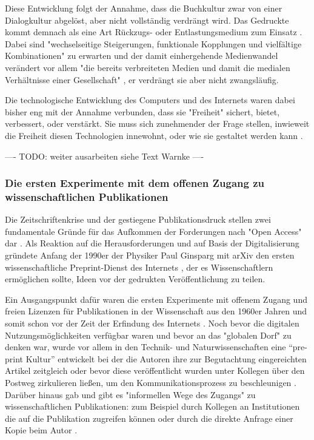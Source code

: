 Diese Entwicklung folgt der Annahme, dass die Buchkultur zwar von einer Dialogkultur abgelöst, aber nicht vollständig verdrängt wird. Das Gedruckte kommt demnach als eine Art Rückzugs- oder Entlastungsmedium zum Einsatz \cite{hagner_2015_sache_buches}. Dabei sind "wechselseitige Steigerungen, funktionale Kopplungen und vielfältige Kombinationen" zu erwarten und der damit einhergehende Medienwandel verändert vor allem "die bereits verbreiteten Medien und damit die medialen Verhältnisse einer Gesellschaft" \cite{Koenen_1997}, er verdrängt sie aber nicht zwangsläufig.

Die technologische Entwicklung des Computers und des Internets waren dabei bisher eng mit der Annahme verbunden, dass sie "Freiheit" sichert, bietet, verbessert, oder verstärkt. Sie muss sich zunehmender der Frage stellen, inwieweit die Freiheit diesen Technologien innewohnt, oder wie sie gestaltet werden kann \cite{kelty_2014_freedom}.

---- TODO: weiter ausarbeiten siehe Text Warnke ----

\subsubsection{Die ersten Experimente mit dem offenen Zugang zu wissenschaftlichen Publikationen}

Die Zeitschriftenkrise und der gestiegene Publikationsdruck stellen zwei fundamentale Gründe für das Aufkommen der Forderungen nach "Open Access" dar \cite{Brintzinger_2010} \cite{suchen}. Als Reaktion auf die Herausforderungen und auf Basis der Digitalisierung gründete Anfang der 1990er der Physiker Paul Ginsparg mit arXiv den ersten wissenschaftliche Preprint-Dienst des Internets \cite{suchen}, der es Wissenschaftlern ermöglichen sollte, Ideen vor der gedrukten Veröffentlichung zu teilen.

Ein Ausgangspunkt dafür waren die ersten Experimente mit offenem Zugang und freien Lizenzen für Publikationen in der Wissenschaft aus den 1960er Jahren und somit schon vor der Zeit der Erfindung des Internets \cite{cite:18b}. Noch bevor die digitalen Nutzungsmöglichkeiten verfügbar waren und bevor an das "globalen Dorf"\cite{mcluhan_1962_gutenberg} zu denken war, wurde vor allem in den Technik- und Naturwissenschaften eine “pre-print Kultur” entwickelt bei der die Autoren ihre zur Begutachtung eingereichten Artikel zeitgleich oder bevor diese veröffentlicht wurden unter Kollegen über den Postweg zirkulieren ließen, um den Kommunikationsprozess zu beschleunigen \cite{suchen-Hoffmann-Zugang-undVerwertung-oeffentlicher-Informationen}. Darüber hinaus gab und gibt es "informellen Wege des Zugangs" zu wissenschaftlichen Publikationen: zum Beispiel durch Kollegen an Institutionen die auf die Publikation zugreifen können oder durch die direkte Anfrage einer Kopie beim Autor \cite{davis_2011_open}.

